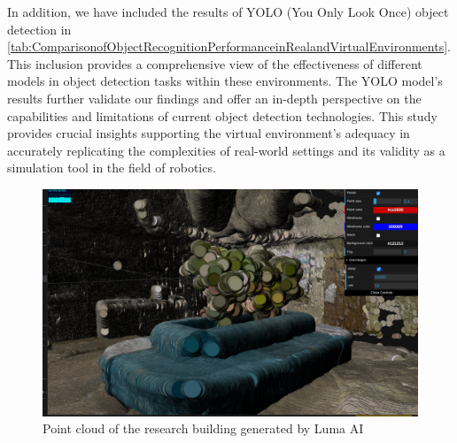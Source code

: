 \singlespacing
In addition, we have included the results of YOLO (You Only Look Once) object detection in \ref{tab:ComparisonofObjectRecognitionPerformanceinRealandVirtualEnvironments}. This inclusion provides a comprehensive view of the effectiveness of different models in object detection tasks within these environments. The YOLO model's results further validate our findings and offer an in-depth perspective on the capabilities and limitations of current object detection technologies. This study provides crucial insights supporting the virtual environment's adequacy in accurately replicating the complexities of real-world settings and its validity as a simulation tool in the field of robotics.
\begin{figure}[htbp]
  \centering
  \includegraphics[scale=0.3]{./Figure/研究等の点群.png}
  \caption{Point cloud of the research building generated by Luma AI}
  \label{fig: Point cloud of the research building generated by Luma AI}
\end{figure}
\
